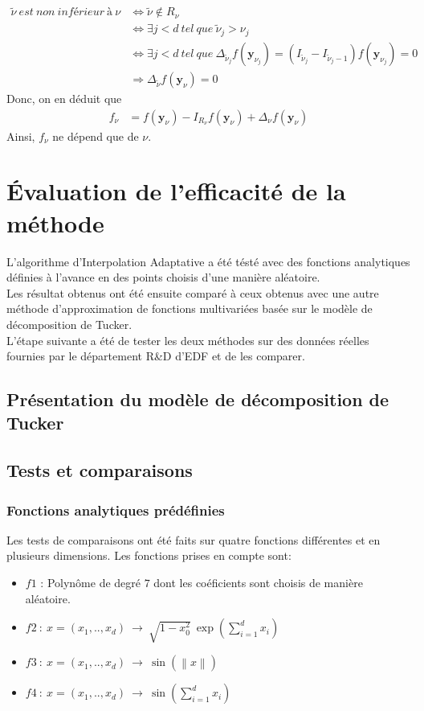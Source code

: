 \begin{align}
		\tilde{\nu}\ est\ non\ inférieur\ à\ \nu 		&	\Leftrightarrow \tilde{\nu} \notin R_{\nu} \\ \nonumber
																								&	\Leftrightarrow \exists j<d\ tel\ que\ \tilde{\nu}_j > \nu_j \\ \nonumber
																								&	\Leftrightarrow \exists j<d\ tel\ que\ \Delta_{\tilde{\nu}_j} f(\textbf{y}_{\nu_j}) = (I_{\tilde{\nu}_j} - I_{\tilde{\nu}_j-1}) f(\textbf{y}_{\nu_j}) = 0\\ \nonumber
																								&	\Rightarrow \Delta_{\tilde{\nu}} f(\textbf{y}_{\nu}) = 0 \nonumber
\end{align}
Donc, on en déduit que
\begin{align}
		f_{\nu} &= f(\textbf{y}_{\nu}) - I_{R_{\nu}}f(\textbf{y}_{\nu}) + \Delta_{\nu}f(\textbf{y}_{\nu}) \nonumber
\end{align}
Ainsi, $f_{\nu}$ ne dépend que de $\nu$.

\section{Évaluation de l’efficacité de la méthode}\label{sec:6}
L'algorithme d'Interpolation Adaptative a été tésté avec des fonctions analytiques définies à l'avance en des points choisis d'une manière aléatoire.\\
Les résultat obtenus ont été ensuite comparé à ceux obtenus avec une autre méthode d'approximation de fonctions multivariées basée sur
le modèle de décomposition de Tucker.\\
L'étape suivante a été de tester les deux méthodes sur des données réelles fournies par le département R\&D d'EDF et de les comparer.

\subsection{Présentation du modèle de décomposition de Tucker}
\newpage
\subsection{Tests et comparaisons}
\subsubsection{Fonctions analytiques prédéfinies}
Les tests de comparaisons ont été faits sur quatre fonctions différentes et en plusieurs dimensions.
Les fonctions prises en compte sont:
\begin{itemize}
	\item $f1$ : Polynôme de degré $7$ dont les coéficients sont choisis de manière aléatoire.
	\item $f2\ :\ x=(x_1,..,x_d)\ \rightarrow \ \sqrt{1-x_0^2}\ \exp(\sum_{i=1}^dx_i)$
	\item $f3\ :\ x=(x_1,..,x_d)\ \rightarrow \ \sin(\left \| x \right \|)$
	\item $f4\ :\ x=(x_1,..,x_d)\ \rightarrow \ \sin(\sum_{i=1}^dx_i)$
\end{itemize}

